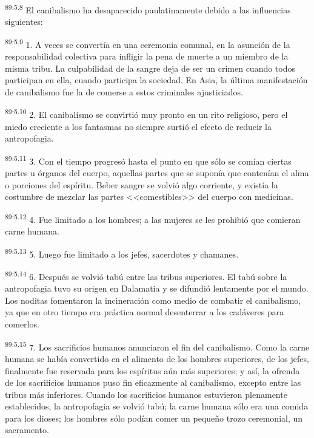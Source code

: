 \par
\textsuperscript{89:5.8} El canibalismo ha desaparecido paulatinamente debido a las influencias siguientes:

\par
\textsuperscript{89:5.9} 1. A veces se convertía en una ceremonia comunal, en la asunción de la responsabilidad colectiva para infligir la pena de muerte a un miembro de la misma tribu. La culpabilidad de la sangre deja de ser un crimen cuando todos participan en ella, cuando participa la sociedad. En Asia, la última manifestación de canibalismo fue la de comerse a estos criminales ajusticiados.

\par
\textsuperscript{89:5.10} 2. El canibalismo se convirtió muy pronto en un rito religioso, pero el miedo creciente a los fantasmas no siempre surtió el efecto de reducir la antropofagia.

\par
\textsuperscript{89:5.11} 3. Con el tiempo progresó hasta el punto en que sólo se comían ciertas partes u órganos del cuerpo, aquellas partes que se suponía que contenían el alma o porciones del espíritu. Beber sangre se volvió algo corriente, y existía la costumbre de mezclar las partes <<comestibles>> del cuerpo con medicinas.

\par
\textsuperscript{89:5.12} 4. Fue limitado a los hombres; a las mujeres se les prohibió que comieran carne humana.

\par
\textsuperscript{89:5.13} 5. Luego fue limitado a los jefes, sacerdotes y chamanes.

\par
\textsuperscript{89:5.14} 6. Después se volvió tabú entre las tribus superiores. El tabú sobre la antropofagia tuvo su origen en Dalamatia y se difundió lentamente por el mundo. Los noditas fomentaron la incineración como medio de combatir el canibalismo, ya que en otro tiempo era práctica normal desenterrar a los cadáveres para comerlos.

\par
\textsuperscript{89:5.15} 7. Los sacrificios humanos anunciaron el fin del canibalismo. Como la carne humana se había convertido en el alimento de los hombres superiores, de los jefes, finalmente fue reservada para los espíritus aún más superiores; y así, la ofrenda de los sacrificios humanos puso fin eficazmente al canibalismo, excepto entre las tribus más inferiores. Cuando los sacrificios humanos estuvieron plenamente establecidos, la antropofagia se volvió tabú; la carne humana sólo era una comida para los dioses; los hombres sólo podían comer un pequeño trozo ceremonial, un sacramento.

